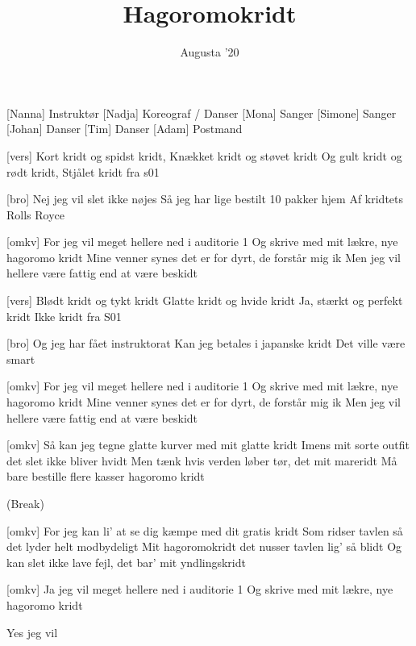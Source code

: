 \documentclass[a4paper,11pt]{article}
\title{Hagoromokridt}
\author{Augusta ’20}
\begin{document}
\maketitle

\begin{roles}
[Nanna] Instruktør
[Nadja] Koreograf / Danser
[Mona] Sanger
[Simone] Sanger
[Johan] Danser
[Tim] Danser
[Adam] Postmand
\end{roles}

\begin{props}
\end{props}


\begin{song}

[vers]%
Kort kridt og spidst kridt,
Knækket kridt og støvet kridt
Og gult kridt og rødt kridt,
Stjålet kridt fra s01

[bro]%
Nej jeg vil slet ikke nøjes
Så jeg har lige bestilt 10 pakker hjem
Af kridtets Rolls Royce

[omkv]%
For jeg vil meget hellere ned i auditorie 1
Og skrive med mit lækre, nye hagoromo kridt
Mine venner synes det er for dyrt, de forstår mig ik
Men jeg vil hellere være fattig end at være beskidt

[vers]%
Blødt kridt og tykt kridt
Glatte kridt og hvide kridt
Ja, stærkt og perfekt kridt
Ikke kridt fra S01

[bro]%
Og jeg har fået instruktorat
Kan jeg betales i japanske kridt
Det ville være smart

[omkv]%
For jeg vil meget hellere ned i auditorie 1
Og skrive med mit lækre, nye hagoromo kridt
Mine venner synes det er for dyrt, de forstår mig ik
Men jeg vil hellere være fattig end at være beskidt

[omkv]%
Så kan jeg tegne glatte kurver med mit glatte kridt
Imens mit sorte outfit det slet ikke bliver hvidt
Men tænk hvis verden løber tør, det mit mareridt
Må bare bestille flere kasser hagoromo kridt

(Break)

[omkv]%
For jeg kan li’ at se dig kæmpe med dit gratis kridt
Som ridser tavlen så det lyder helt modbydeligt
Mit hagoromokridt det nusser tavlen lig’ så blidt
Og kan slet ikke lave fejl, det bar’ mit yndlingskridt

[omkv]%
Ja jeg vil meget hellere ned i auditorie 1
Og skrive med mit lækre, nye hagoromo kridt

Yes jeg vil

\end{song}
\end{document}
